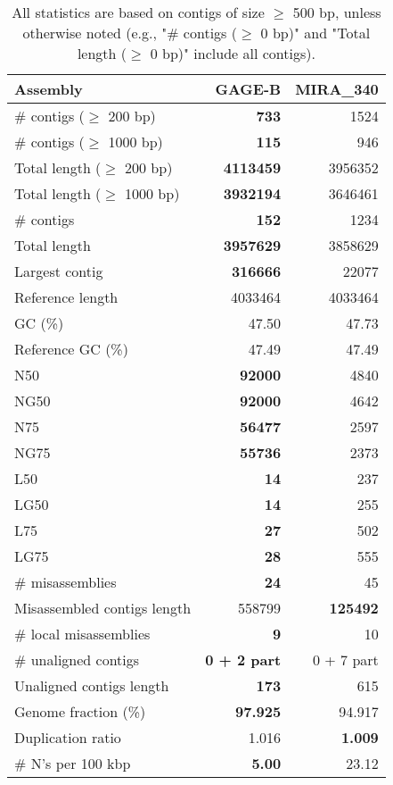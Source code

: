 \documentclass[12pt,a4paper]{article}
\begin{document}
\begin{table}[ht]
\begin{center}
\caption{All statistics are based on contigs of size $\geq$ 500 bp, unless otherwise noted (e.g., "\# contigs ($\geq$ 0 bp)" and "Total length ($\geq$ 0 bp)" include all contigs).}
\begin{tabular}{|l*{2}{|r}|}
\hline
Assembly & GAGE-B & MIRA\_340 \\ \hline
\# contigs ($\geq$ 200 bp) & {\bf 733} & 1524 \\ \hline
\# contigs ($\geq$ 1000 bp) & {\bf 115} & 946 \\ \hline
Total length ($\geq$ 200 bp) & {\bf 4113459} & 3956352 \\ \hline
Total length ($\geq$ 1000 bp) & {\bf 3932194} & 3646461 \\ \hline
\# contigs & {\bf 152} & 1234 \\ \hline
Total length & {\bf 3957629} & 3858629 \\ \hline
Largest contig & {\bf 316666} & 22077 \\ \hline
Reference length & 4033464 & 4033464 \\ \hline
GC (\%) & 47.50 & 47.73 \\ \hline
Reference GC (\%) & 47.49 & 47.49 \\ \hline
N50 & {\bf 92000} & 4840 \\ \hline
NG50 & {\bf 92000} & 4642 \\ \hline
N75 & {\bf 56477} & 2597 \\ \hline
NG75 & {\bf 55736} & 2373 \\ \hline
L50 & {\bf 14} & 237 \\ \hline
LG50 & {\bf 14} & 255 \\ \hline
L75 & {\bf 27} & 502 \\ \hline
LG75 & {\bf 28} & 555 \\ \hline
\# misassemblies & {\bf 24} & 45 \\ \hline
Misassembled contigs length & 558799 & {\bf 125492} \\ \hline
\# local misassemblies & {\bf 9} & 10 \\ \hline
\# unaligned contigs & {\bf 0 + 2 part} & 0 + 7 part \\ \hline
Unaligned contigs length & {\bf 173} & 615 \\ \hline
Genome fraction (\%) & {\bf 97.925} & 94.917 \\ \hline
Duplication ratio & 1.016 & {\bf 1.009} \\ \hline
\# N's per 100 kbp & {\bf 5.00} & 23.12 \\ \hline

\end{tabular}
\end{center}
\end{table}
\end{document}
